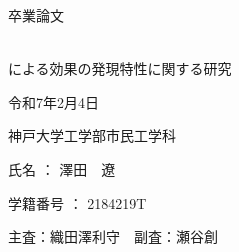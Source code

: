 \thispagestyle{empty}
\pagestyle{empty}
\begin{center}
\Huge{卒業論文}

\vspace*{0.8cm}

\Huge{ \\による効果の発現特性に関する研究}\\

\vspace*{7.0cm} %


\huge{令和\textsf{7}年\textsf{2}月\textsf{4}日}


\vspace*{0.5cm}

\huge{神戸大学工学部市民工学科}

\vspace*{1cm}

\huge{氏名 ： 澤田　遼}

\vspace*{0.5cm}

\huge{学籍番号 ： \textsf{2184219T}}

\vspace*{1cm}

\large{主査：織田澤利守　副査：瀬谷創}

\end{center}

